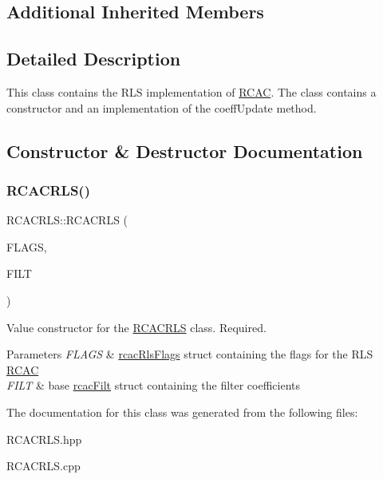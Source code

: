 \subsection*{Additional Inherited Members}


\subsection{Detailed Description}
This class contains the R\+LS implementation of \hyperlink{class_r_c_a_c}{R\+C\+AC}. The class contains a constructor and an implementation of the coeff\+Update method. 

\subsection{Constructor \& Destructor Documentation}
\mbox{\label{class_r_c_a_c_r_l_s_aaac6f50062f37e04d10c40ba55063324}} 
\subsubsection{\texorpdfstring{R\+C\+A\+C\+R\+L\+S()}{RCACRLS()}}
{\footnotesize\ttfamily R\+C\+A\+C\+R\+L\+S\+::\+R\+C\+A\+C\+R\+LS (\begin{DoxyParamCaption}\item[{\hyperlink{structrcac_rls_flags}{rcac\+Rls\+Flags} \&}]{F\+L\+A\+GS,  }\item[{\hyperlink{structrcac_filt}{rcac\+Filt} \&}]{F\+I\+LT }\end{DoxyParamCaption})}

Value constructor for the \hyperlink{class_r_c_a_c_r_l_s}{R\+C\+A\+C\+R\+LS} class. Required.


\begin{DoxyParams}{Parameters}
{\em F\+L\+A\+GS} & \hyperlink{structrcac_rls_flags}{rcac\+Rls\+Flags} struct containing the flags for the R\+LS \hyperlink{class_r_c_a_c}{R\+C\+AC} \\
\hline
{\em F\+I\+LT} & base \hyperlink{structrcac_filt}{rcac\+Filt} struct containing the filter coefficients \\
\hline
\end{DoxyParams}


The documentation for this class was generated from the following files\+:\begin{DoxyCompactItemize}
\item 
R\+C\+A\+C\+R\+L\+S.\+hpp\item 
R\+C\+A\+C\+R\+L\+S.\+cpp\end{DoxyCompactItemize}
